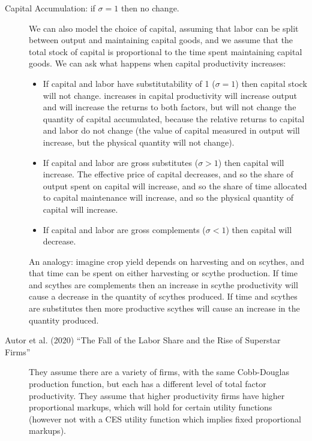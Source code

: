 \documentclass[
  11pt,
  letterpaper,
  DIV=11,
  numbers=noendperiod,
  oneside]{scrartcl}
\providecommand{\tightlist}{%
  \setlength{\itemsep}{0pt}\setlength{\parskip}{0pt}}\usepackage{longtable,booktabs,array}
\begin{document}
\begin{description}
\item[Capital Accumulation: if \(\sigma=1\) then no change.]
We can also model the choice of capital, assuming that labor can be
split between output and maintaining capital goods, and we assume that
the total stock of capital is proportional to the time spent maintaining
capital goods. We can ask what happens when capital productivity
increases:

\begin{itemize}
\tightlist
\item
  If capital and labor have substitutability of 1 (\(\sigma=1\)) then
  capital stock will not change. increases in capital productivity will
  increase output and will increase the returns to both factors, but
  will not change the quantity of capital accumulated, because the
  relative returns to capital and labor do not change (the value of
  capital measured in output will increase, but the physical quantity
  will not change).
\end{itemize}

\begin{itemize}
\tightlist
\item
  If capital and labor are gross substitutes (\(\sigma>1\)) then capital
  will increase. The effective price of capital decreases, and so the
  share of output spent on capital will increase, and so the share of
  time allocated to capital maintenance will increase, and so the
  physical quantity of capital will increase.
\end{itemize}

\begin{itemize}
\tightlist
\item
  If capital and labor are gross complements (\(\sigma<1\)) then capital
  will decrease.
\end{itemize}

An analogy: imagine crop yield depends on harvesting and on scythes, and
that time can be spent on either harvesting or scythe production. If
time and scythes are complements then an increase in scythe productivity
will cause a decrease in the quantity of scythes produced. If time and
scythes are substitutes then more productive scythes will cause an
increase in the quantity produced.
\item[Autor et al. (2020) ``The Fall of the Labor Share and the Rise of
Superstar Firms'']
They assume there are a variety of firms, with the same Cobb-Douglas
production function, but each has a different level of total factor
productivity. They assume that higher productivity firms have higher
proportional markups, which will hold for certain utility functions
(however not with a CES utility function which implies fixed
proportional markups).


\end{description}
\end{document}
